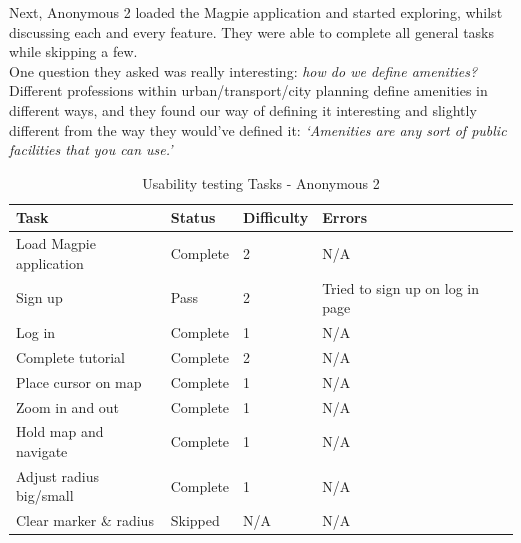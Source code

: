 \noindent Next, Anonymous 2 loaded the Magpie application and started exploring, whilst discussing each and every feature. They were able to complete all general tasks while skipping a few.\\
One question they asked was really interesting: \emph{how do we define amenities?}\\ Different professions within urban/transport/city planning define amenities in different ways, and they found our way of defining it interesting and slightly different from the way they would've defined it: \emph{`Amenities are any sort of public facilities that you can use.'}\\
\begin{table}[h!]
    \centering
    \caption{Usability testing Tasks - Anonymous 2}
    \begin{tabular}{|p{}|p{}|p{}|p{}|p{}|}
        \hline
        \textbf{Task}                 & \textbf{Status} & \textbf{Difficulty} & \textbf{Errors}                 \\
        \hline
        Load Magpie application       & Complete        & 2                   & N/A                             \\
        \hline
        Sign up                       & Pass            & 2                   & Tried to sign up on log in page \\
        \hline
        Log in                        & Complete        & 1                   & N/A                             \\
        \hline
        Complete tutorial             & Complete        & 2                   & N/A                             \\
        \hline
        Place cursor on map           & Complete        & 1                   & N/A                             \\
        \hline
        Zoom in and out               & Complete        & 1                   & N/A                             \\
        \hline
        Hold map and navigate         & Complete        & 1                   & N/A                             \\
        \hline
        Adjust radius big/small       & Complete        & 1                   & N/A                             \\
        \hline
        Clear marker \& radius        & Skipped         & N/A                 & N/A                             \\

\end{tabular}
\end{table}
